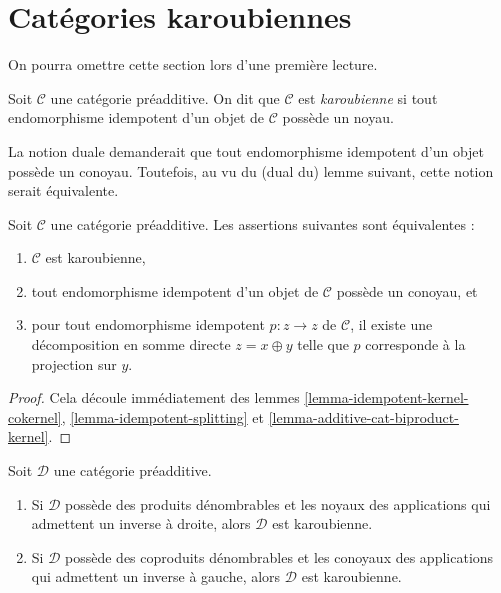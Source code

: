 \section{Catégories karoubiennes}
\label{section-karoubian}

\noindent
On pourra omettre cette section lors d'une première lecture.

\begin{definition}
\label{definition-karoubian}
Soit $\mathcal{C}$ une catégorie préadditive. On dit que $\mathcal{C}$
est {\it karoubienne} si tout endomorphisme idempotent d'un objet
de $\mathcal{C}$ possède un noyau.
\end{definition}

\noindent
La notion duale demanderait que tout endomorphisme idempotent d'un
objet possède un conoyau. Toutefois, au vu du (dual du)
lemme suivant, cette notion serait équivalente.

\begin{lemma}
\label{lemma-karoubian}
Soit $\mathcal{C}$ une catégorie préadditive. Les assertions
suivantes sont équivalentes :
\begin{enumerate}
\item $\mathcal{C}$ est karoubienne,
\item tout endomorphisme idempotent d'un objet de $\mathcal{C}$ possède un
conoyau, et
\item pour tout endomorphisme idempotent $p : z \to z$ de $\mathcal{C}$,
il existe une décomposition en somme directe $z = x \oplus y$ telle
que $p$ corresponde à la projection sur $y$.
\end{enumerate}
\end{lemma}

\begin{proof}
Cela découle immédiatement des lemmes \ref{lemma-idempotent-kernel-cokernel},
\ref{lemma-idempotent-splitting} et \ref{lemma-additive-cat-biproduct-kernel}.
\end{proof}

\begin{lemma}
\label{lemma-projectors-have-images}
Soit $\mathcal{D}$ une catégorie préadditive.
\begin{enumerate}
\item Si $\mathcal{D}$ possède des produits dénombrables et les noyaux des applications
qui admettent un inverse à droite, alors $\mathcal{D}$ est karoubienne.
\item Si $\mathcal{D}$ possède des coproduits dénombrables et les conoyaux des
applications qui admettent un inverse à gauche, alors $\mathcal{D}$ est karoubienne.
\end{enumerate}
\end{lemma}

